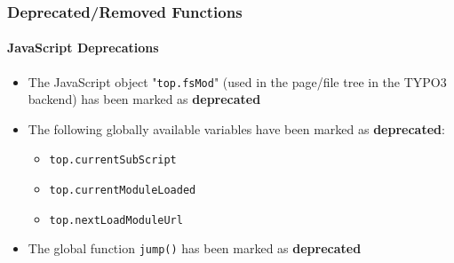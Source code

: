 %

\begin{frame}[fragile]
	\frametitle{Deprecated/Removed Functions}
	\framesubtitle{JavaScript Deprecations}


	\begin{itemize}
		\item The JavaScript object "\texttt{top.fsMod}" (used in the page/file
			tree in the TYPO3 backend) has been marked as \textbf{deprecated}
		\item The following globally available variables have been marked as
			\textbf{deprecated}:
			\begin{itemize}\small
				\item \texttt{top.currentSubScript}
				\item \texttt{top.currentModuleLoaded}
				\item \texttt{top.nextLoadModuleUrl}
			\end{itemize}\normalsize
		\item The global function \texttt{jump()} has been marked as
			\textbf{deprecated}
	\end{itemize}

\end{frame}

